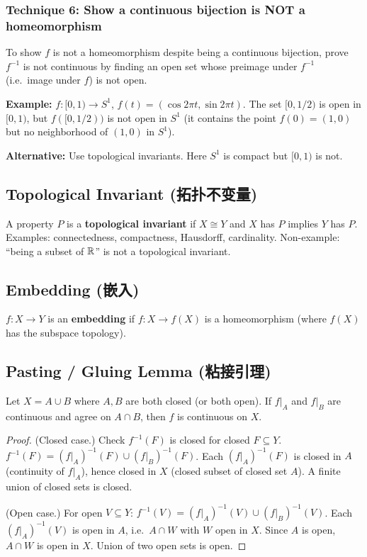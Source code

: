 \documentclass{article}
\begin{document}
\subsubsection*{Technique 6: Show a continuous bijection is NOT a homeomorphism}
To show $f$ is not a homeomorphism despite being a continuous bijection,
prove $f^{-1}$ is not continuous by finding an open set whose preimage
under $f^{-1}$ (i.e.\ image under $f$) is not open.

\textbf{Example:} $f : [0,1) \to S^1$, $f(t) = (\cos 2\pi t, \sin 2\pi t)$.
The set $[0, 1/2)$ is open in $[0,1)$, but $f([0,1/2))$ is not open in
$S^1$ (it contains the point $f(0) = (1,0)$ but no neighborhood of
$(1,0)$ in $S^1$).

\textbf{Alternative:} Use topological invariants. Here $S^1$ is compact
but $[0,1)$ is not.

\subsection{Topological Invariant (拓扑不变量)}\label{def:topo-invariant}
A property $P$ is a \textbf{topological invariant} if $X \cong Y$ and
$X$ has $P$ implies $Y$ has $P$.
Examples: connectedness, compactness, Hausdorff, cardinality.
Non-example: ``being a subset of $\mathbb{R}$'' is not a topological invariant.

\subsection{Embedding (嵌入)}\label{def:embedding}
$f : X \to Y$ is an \textbf{embedding} if $f : X \to f(X)$ is a
homeomorphism (where $f(X)$ has the subspace topology).

\subsection{Pasting / Gluing Lemma (粘接引理)}\label{def:pasting}
\begin{theorem}
  Let $X = A \cup B$ where $A, B$ are both closed (or both open). If
  $f|_A$ and $f|_B$ are continuous and agree on $A \cap B$, then $f$
  is continuous on $X$.
\end{theorem}
\begin{proof}
  (Closed case.) Check $f^{-1}(F)$ is closed for closed $F \subseteq Y$.
  $f^{-1}(F) = (f|_A)^{-1}(F) \cup (f|_B)^{-1}(F)$.
  Each $(f|_A)^{-1}(F)$ is closed in $A$ (continuity of $f|_A$),
  hence closed in $X$ (closed subset of closed set $A$).
  A finite union of closed sets is closed.

  (Open case.) For open $V \subseteq Y$: $f^{-1}(V) = (f|_A)^{-1}(V)
  \cup (f|_B)^{-1}(V)$.
  Each $(f|_A)^{-1}(V)$ is open in $A$, i.e.\ $A \cap W$ with $W$ open in $X$.
  Since $A$ is open, $A \cap W$ is open in $X$. Union of two open sets is open.
\end{proof}
\end{document}
